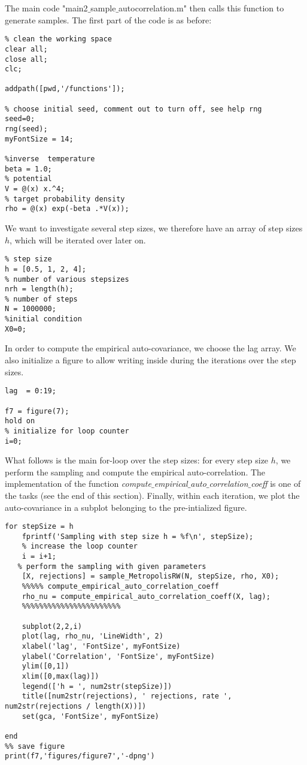 \documentclass{scrartcl}
\begin{document}
The main code "main2$\_$sample$\_$autocorrelation.m" then calls this function to generate samples. The first part of the code is as before:
\begin{verbatim}
% clean the working space
clear all;
close all;
clc;

addpath([pwd,'/functions']);

% choose initial seed, comment out to turn off, see help rng
seed=0;
rng(seed);
myFontSize = 14;

%inverse  temperature 
beta = 1.0;
% potential
V = @(x) x.^4;
% target probability density
rho = @(x) exp(-beta .*V(x));
\end{verbatim}
We want to investigate several step sizes, we therefore have an array of step sizes $h$, which will be iterated over later on.
\begin{verbatim}
% step size
h = [0.5, 1, 2, 4];
% number of various stepsizes
nrh = length(h);
% number of steps 
N = 1000000;
%initial condition 
X0=0;
\end{verbatim}
In order to compute the empirical auto-covariance, we choose the lag array. We also initialize a figure to allow writing inside during the iterations over the step sizes.
\begin{verbatim}
lag  = 0:19;

f7 = figure(7);
hold on
% initialize for loop counter
i=0;
\end{verbatim}
What follows is the main for-loop over the step sizes: for every step size $h$, we perform the sampling and compute the empirical auto-correlation. The implementation of the function \textit{compute$\_$empirical$\_$auto$\_$correlation$\_$coeff} is one of the tasks (see the end of this section). Finally, within each iteration, we plot the auto-covariance in a subplot belonging to the pre-intialized figure.
\begin{verbatim}
for stepSize = h 
    fprintf('Sampling with step size h = %f\n', stepSize);
    % increase the loop counter
    i = i+1;
   % perform the sampling with given parameters	
    [X, rejections] = sample_MetropolisRW(N, stepSize, rho, X0);
    %%%%% compute_empirical_auto_correlation_coeff
    rho_nu = compute_empirical_auto_correlation_coeff(X, lag);
    %%%%%%%%%%%%%%%%%%%%%%%
    
    subplot(2,2,i)
    plot(lag, rho_nu, 'LineWidth', 2)
    xlabel('lag', 'FontSize', myFontSize)
    ylabel('Correlation', 'FontSize', myFontSize)
    ylim([0,1])
    xlim([0,max(lag)])
    legend(['h = ', num2str(stepSize)])
    title([num2str(rejections), ' rejections, rate ', num2str(rejections / length(X))])
    set(gca, 'FontSize', myFontSize)

end
%% save figure
print(f7,'figures/figure7','-dpng')
\end{verbatim}
\end{document}
